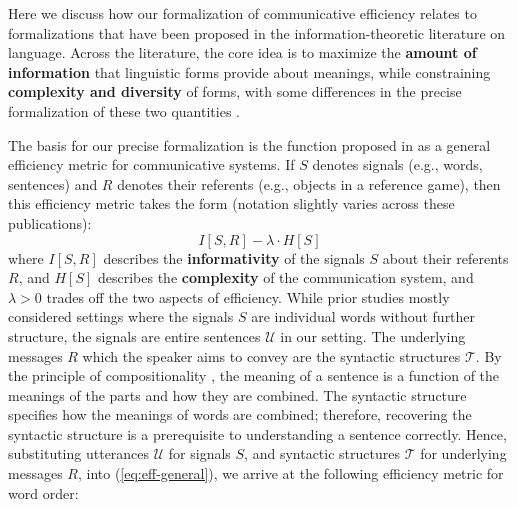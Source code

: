 \documentclass[10pt,twoside,lineno]{article}
\newcommand{\key}[1]{\textbf{#1}}
\newcommand{\utterance}{\mathcal{U}}
\newcommand{\tree}{\mathcal{T}}
\begin{document}
Here we discuss how our formalization of communicative efficiency relates to formalizations that have been proposed in the information-theoretic literature on language.
Across the literature, the core idea is to maximize the \key{amount of information} that linguistic forms provide about meanings, while constraining \key{complexity and diversity} of forms, with some differences in the precise formalization of these two quantities \cite{ferreri2003least,ferrericancho2007global,kemp2012kinship,frank2012predicting,goodman2013knowledge,kao2014nonliteral,xu2014numeral,kirby2015compression,regier2015word,xu2016historical,futrell2017memory,zaslavsky2018efficient,bennett2018extremely, peloquin2019interactions,zaslavsky2019semantic}.

The basis for our precise formalization is the function proposed in \cite{ferreri2003least,ferrericancho2007global,futrell2017memory,peloquin2019interactions} as a general efficiency metric for communicative systems.
If $S$ denotes signals (e.g., words, sentences) and $R$ denotes their referents (e.g., objects in a reference game), then this efficiency metric takes the form (notation slightly varies across these publications):
\begin{equation}\label{eq:eff-general}
I[S, R] - \lambda \cdot H[S]
\end{equation}
where $I[S, R]$ describes the \key{informativity} of the signals $S$ about their referents $R$, and $H[S]$ describes the \key{complexity} of the communication system, and $\lambda > 0$ trades off the two aspects of efficiency.
While prior studies \cite{ferreri2003least, kemp2012kinship,regier2015word,zaslavsky2018efficient} mostly considered settings where the signals $S$ are individual words without further structure, the signals are entire sentences $\utterance$ in our setting.
The underlying messages $R$ which the speaker aims to convey are the syntactic structures $\tree$.
By the principle of compositionality \cite{frege1892sinn}, the meaning of a sentence is a function of the meanings of the parts and how they are combined.
The syntactic structure specifies how the meanings of words are combined; therefore, recovering the syntactic structure is a prerequisite to understanding a sentence correctly.
Hence, substituting utterances $\utterance$ for signals $S$, and syntactic structures $\tree$ for underlying messages $R$, into (\ref{eq:eff-general}), we  arrive at the following efficiency metric for word order:
\end{document}
